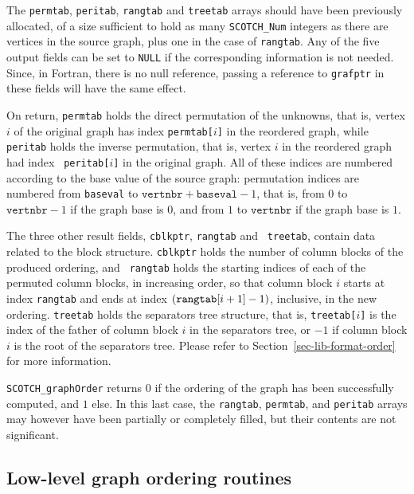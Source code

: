\begin{itemize}
The {\tt permtab}, {\tt peritab}, {\tt rangtab} and {\tt treetab}
arrays should have been previously allocated, of a size sufficient to
hold as many {\tt SCOTCH\_\lbt Num} integers as there are vertices in
the source graph, plus one in the case of {\tt rangtab}. Any of the
five output fields can be set to {\tt NULL} if the corresponding
information is not needed. Since, in Fortran, there is no null
reference, passing a reference to {\tt grafptr} in these fields will
have the same effect.

On return, {\tt permtab} holds the direct permutation of the unknowns,
that is, vertex $i$ of the original graph has index {\tt permtab[$i$]}
in the reordered graph, while {\tt peritab} holds the inverse
permutation, that is, vertex $i$ in the reordered graph had index {\tt
peritab[$i$]} in the original graph. All of these indices are numbered
according to the base value of the source graph: permutation indices
are numbered from {\tt baseval} to
$\mathtt{vertnbr} + \mathtt{baseval} - 1$, that is,
from $0$ to $\mathtt{vertnbr} - 1$ if the graph base is
$0$, and from $1$ to $\mathtt{vertnbr}$ if the graph base is $1$.

The three other result fields, {\tt *cblkptr}, {\tt rangtab} and {\tt
treetab}, contain data related to the block structure. {\tt *cblkptr}
holds the number of column blocks of the produced ordering, and {\tt
rangtab} holds the starting indices of each of the permuted column
blocks, in increasing order, so that column block $i$ starts at index
{\tt rangtab\lbt [$i$]} and ends at index $(\mbox{\tt
rangtab}\lbt\mathtt{[}i + 1\mathtt{]} - 1)$, inclusive, in the new
ordering. {\tt treetab} holds the separators tree structure, that is,
{\tt treetab[$i$]} is the index of the father of column block $i$ in
the separators tree, or $-1$ if column block $i$ is the root of the
separators tree. Please refer to Section~\ref{sec-lib-format-order}
for more information.

\progret

{\tt SCOTCH\_graphOrder} returns $0$ if the ordering of the graph has
been successfully computed, and $1$ else. In this last case, the
{\tt rangtab}, {\tt permtab}, and {\tt peritab} arrays may however have
been partially or completely filled, but their contents are not significant.
\end{itemize}

\subsection{Low-level graph ordering routines}

